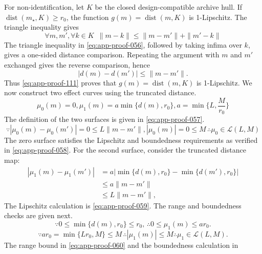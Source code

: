 \documentclass[11pt]{article}
\numberwithin{equation}{section}
\DeclareMathOperator{\dist}{dist}
\newcommand{\1}{\mathbf 1}
\begin{document}
For non-identification, let \(K\) be the closed design-compatible archive
hull.  If \(\dist(m_\star,K)\ge r_0\), the function
\(g(m)=\dist(m,K)\) is 1-Lipschitz.  The triangle inequality gives
\begin{equation}
\label{eq:app-proof-056}
\forall m,m',\forall k\in K \,\,\,\|m-k\|
\le
\|m-m'\|+\|m'-k\|
\end{equation}
The triangle inequality in \eqref{eq:app-proof-056}, followed by taking
infima over \(k\), gives a one-sided distance comparison.  Repeating the
argument with \(m\) and \(m'\) exchanged gives the reverse comparison, hence
\begin{equation}
\label{eq:app-proof-111}
|d(m)-d(m')|
\le\|m-m'\|.
\end{equation}
Thus \eqref{eq:app-proof-111} proves that \(g(m)=\dist(m,K)\) is
1-Lipschitz.  We now construct two effect curves using the truncated
distance.
\begin{equation}
\label{eq:app-proof-057}
\mu_0(m)=0,
\mu_1(m)
=
a\min\{d(m),r_0\},
a=\min\{L,\frac{M}{r_0}\}
\end{equation}
The definition of the two surfaces is given in \eqref{eq:app-proof-057}.
\begin{equation}
\label{eq:app-proof-058}
\because|\mu_0(m)-\mu_0(m')|=0\le L\|m-m'\|,|\mu_0(m)|=0\le M\,\therefore\mu_0\in\mathcal L(L,M)
\end{equation}
The zero surface satisfies the Lipschitz and boundedness requirements as
verified in \eqref{eq:app-proof-058}.  For the second surface, consider the
truncated distance map:
\begin{equation}
\label{eq:app-proof-059}
\begin{aligned}
|\mu_1(m)-\mu_1(m')|
&=
a\left|
\min\{d(m),r_0\}
-
\min\{d(m'),r_0\}
\right|\\
&\le
a\|m-m'\|\\
&\le
L\|m-m'\|,
\end{aligned}
\end{equation}
The Lipschitz calculation is \eqref{eq:app-proof-059}.  The range and
boundedness checks are given next.
\begin{equation}
\label{eq:app-proof-060}
\because0\le\min\{d(m),r_0\}\le r_0,\,\therefore0\le\mu_1(m)\le ar_0.
\end{equation}
\begin{equation}
\label{eq:app-proof-061}
\because ar_0
=
\min\{Lr_0,M\}
\le M\,
\therefore|\mu_1(m)|\le M
\therefore\mu_1\in\mathcal L(L,M).
\end{equation}
The range bound in \eqref{eq:app-proof-060} and the boundedness calculation in
\end{document}
